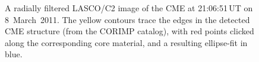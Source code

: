 \documentclass[namedreferences]{solarphysics}
\begin{document}
\begin{article}
\begin{figure}[t]
\caption{A radially filtered LASCO/C2 image of the CME at 21:06:51\,UT on 8~March~2011. The yellow contours trace the edges in the detected CME structure (from the CORIMP catalog), with red points clicked along the corresponding core material, and a resulting ellipse-fit in blue.}
\label{lasco_c2_fig}
\end{figure}



\end{article}
\end{document}
